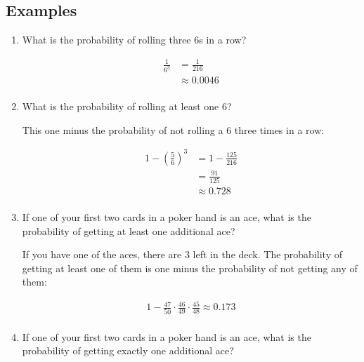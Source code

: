 \documentclass[landscape]{exam}
\begin{document}
  \subsection{Examples}
  \begin{enumerate}
    \item What is the probability of rolling three 6s in a row?
      \begin{solution}
        \begin{align*}
          \frac{1}{6^3} & = \frac{1}{216} \\
                        & \approx \boxed{ 0.0046 } \\
        \end{align*}
      \end{solution}

    \item What is the probability of rolling at least one 6?
      \begin{solution}
        This one minus the probability of not rolling a 6 three times in a row:

        \begin{align*}
          1 - \left( \frac{5}{6} \right)^3 & = 1 - \frac{125}{216} \\
                                           & = \frac{91}{125} \\
                                           & \approx \boxed{ 0.728 } \\
        \end{align*}

      \end{solution}

    \item If one of your first two cards in a poker hand is an ace, what is the
      probability of getting at least one additional ace?

      \begin{solution}
        If you have one of the aces, there are 3 left in the deck. The
        probability of getting at least one of them is one minus the probability
        of not getting any of them:

        \begin{align*}
          1 - \frac{47}{50} \cdot \frac{46}{49} \cdot \frac{45}{48} \approx 0.173 \\
        \end{align*}
      \end{solution}

    \item If one of your first two cards in a poker hand is an ace, what is the
      probability of getting exactly one additional ace?


\end{enumerate}
\end{document}
